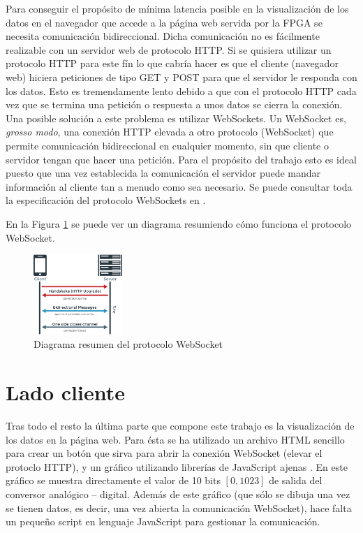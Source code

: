 \documentclass[conference,compsoc]{IEEEtran}
\begin{document}
		Para conseguir el prop\'osito de m\'inima latencia posible en la visualizaci\'on de los datos en
		el navegador que accede a la p\'agina web servida por la FPGA se necesita comunicaci\'on
		bidireccional. Dicha comunicaci\'on no es f\'acilmente realizable con un servidor web de
		protocolo HTTP. Si se quisiera utilizar un protocolo HTTP para este f\'in lo que cabr\'ia hacer
		es que el cliente (navegador web) hiciera peticiones de tipo GET y POST para que el servidor le
		responda con los datos. Esto es tremendamente lento debido a que con el protocolo HTTP cada vez
		que se termina una petici\'on o respuesta a unos datos se cierra la conexi\'on. Una posible
		soluci\'on a este problema es utilizar WebSockets. Un WebSocket es, \emph{grosso modo}, una
		conexi\'on HTTP elevada a otro protocolo (WebSocket) que permite comunicaci\'on bidireccional en
		cualquier momento, sin que cliente o servidor tengan que hacer una petici\'on. Para el
		prop\'osito del trabajo esto es ideal puesto que una vez establecida la comunicaci\'on el
		servidor puede mandar informaci\'on al cliente tan a menudo como sea necesario. Se puede
		consultar toda la especificaci\'on del protocolo WebSockets en \cite{bib:ws}.

		En la Figura \ref{fig:ws_diagrama} se puede ver un diagrama resumiendo c\'omo funciona el
		protocolo WebSocket.

		\begin{figure}[h!]
			\centering
			\includegraphics[width=0.3\textwidth]{./figuras/ws_diagrama.png}
			\caption{Diagrama resumen del protocolo WebSocket}
			\label{fig:ws_diagrama}
		\end{figure}

	\section{Lado cliente}

		Tras todo el resto la \'ultima parte que compone este trabajo es la visualizaci\'on de los
		datos en la p\'agina web. Para \'esta se ha utilizado un archivo HTML sencillo para crear un
		bot\'on que sirva para abrir la conexi\'on WebSocket (elevar el protoclo HTTP), y un
		gr\'afico utilizando librer\'ias de JavaScript ajenas \cite{bib:plotly-js}. En este
		gr\'afico se muestra directamente el valor de 10 bits $[0,1023]$ de salida del conversor
		anal\'ogico -- digital. Adem\'as de este gr\'afico (que s\'olo se dibuja una vez se tienen
		datos, es decir, una vez abierta la comunicaci\'on WebSocket), hace falta un peque\~no
		script en lenguaje JavaScript para gestionar la comunicaci\'on.
\end{document}
